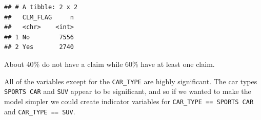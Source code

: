 \documentclass[]{book}
\newenvironment{Shaded}{\begin{snugshade}}{\end{snugshade}}
\newcommand{\DataTypeTok}[1]{\textcolor[rgb]{0.13,0.29,0.53}{#1}}
\newcommand{\DecValTok}[1]{\textcolor[rgb]{0.00,0.00,0.81}{#1}}
\newcommand{\FloatTok}[1]{\textcolor[rgb]{0.00,0.00,0.81}{#1}}
\newcommand{\KeywordTok}[1]{\textcolor[rgb]{0.13,0.29,0.53}{\textbf{#1}}}
\newcommand{\NormalTok}[1]{#1}
\newcommand{\OperatorTok}[1]{\textcolor[rgb]{0.81,0.36,0.00}{\textbf{#1}}}
\newcommand{\StringTok}[1]{\textcolor[rgb]{0.31,0.60,0.02}{#1}}
\begin{document}
\begin{Shaded}
\end{Shaded}

\begin{verbatim}
## # A tibble: 2 x 2
##   CLM_FLAG     n
##   <chr>    <int>
## 1 No        7556
## 2 Yes       2740
\end{verbatim}

About 40\% do not have a claim while 60\% have at least one claim.

\begin{Shaded}
\end{Shaded}

All of the variables except for the \texttt{CAR\_TYPE} are highly significant. The car types \texttt{SPORTS\ CAR} and \texttt{SUV} appear to be significant, and so if we wanted to make the model simpler we could create indicator variables for \texttt{CAR\_TYPE\ ==\ SPORTS\ CAR} and \texttt{CAR\_TYPE\ ==\ SUV}.
\end{document}
